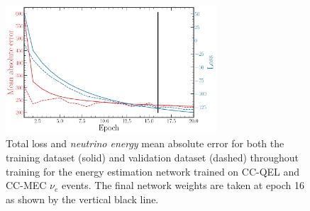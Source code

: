 \begin{figure} %
    \includegraphics[width=0.7\textwidth]{diagrams/7-results/final_energy_history.pdf}
    \caption[Loss and mean absolute error throughout training for the beam classification network]
    {Total loss and \emph{neutrino energy} mean absolute error for both the training dataset
        (solid) and validation dataset (dashed) throughout training for the energy estimation
        network trained on CC-QEL and CC-MEC $\nu_{e}$ events. The final network weights are taken
        at epoch 16 as shown by the vertical black line.}
    \label{fig:final_energy_history}
\end{figure}
